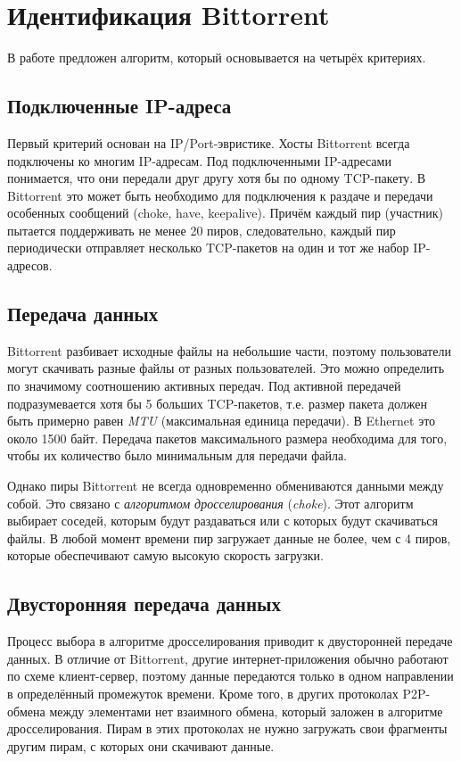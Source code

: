 \documentclass[bachelor, och, coursework]{SCWorks}
\begin{document}
\section{Идентификация Bittorrent}
В работе \cite{bittorrent} предложен алгоритм, который основывается на четырёх критериях.

\subsection{Подключенные IP-адреса}
Первый критерий основан на IP/Port-эвристике. Хосты Bittorrent всегда подключены ко многим IP-адресам.
Под подключенными IP-адресами понимается, что они передали друг другу хотя бы
по одному TCP-пакету. В Bittorrent это может быть необходимо для подключения к раздаче и передачи особенных
сообщений (choke, have, keepalive). Причём каждый пир (участник) пытается поддерживать не менее 20 пиров, следовательно,
каждый пир периодически отправляет несколько TCP-пакетов на один и тот же набор IP-адресов.

\subsection{Передача данных}
Bittorrent разбивает исходные файлы на небольшие части, поэтому пользователи могут скачивать разные файлы
от разных пользователей. Это можно определить по значимому соотношению активных передач. Под активной передачей
подразумевается хотя бы 5 больших TCP-пакетов, т.е. размер пакета должен быть примерно равен \textit{MTU} (максимальная единица передачи). В Ethernet это около 1500 байт. Передача пакетов максимального размера необходима для того, 
чтобы их количество было минимальным для передачи файла.

Однако пиры Bittorrent не всегда одновременно обмениваются данными между собой. 
Это связано с \textit{алгоритмом дросселирования} (\textit{choke}). Этот алгоритм выбирает соседей, которым будут раздаваться или с которых будут скачиваться файлы. В любой момент времени пир загружает данные не более, чем 
с 4 пиров, которые обеспечивают самую высокую скорость загрузки. %
 
\subsection{Двусторонняя передача данных}
Процесс выбора в алгоритме дросселирования приводит к двусторонней передаче данных. В отличие от Bittorrent, другие 
интернет-приложения обычно работают по схеме клиент-сервер, поэтому данные передаются только в одном направлении в 
определённый промежуток времени. Кроме того, в других протоколах P2P-обмена между элементами нет взаимного обмена,
который заложен в алгоритме дросселирования. Пирам в этих протоколах не нужно загружать свои фрагменты другим пирам,
с которых они скачивают данные. 
\end{document}
